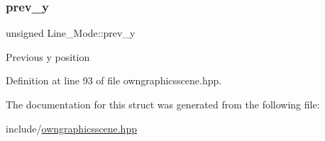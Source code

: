 \subsubsection{\texorpdfstring{prev\+\_\+y}{prev\_y}}
{\footnotesize\ttfamily unsigned Line\+\_\+\+Mode\+::prev\+\_\+y}

Previous y position 

Definition at line 93 of file owngraphicsscene.\+hpp.



The documentation for this struct was generated from the following file\+:\begin{DoxyCompactItemize}
\item 
include/\mbox{\hyperlink{owngraphicsscene_8hpp}{owngraphicsscene.\+hpp}}\end{DoxyCompactItemize}
